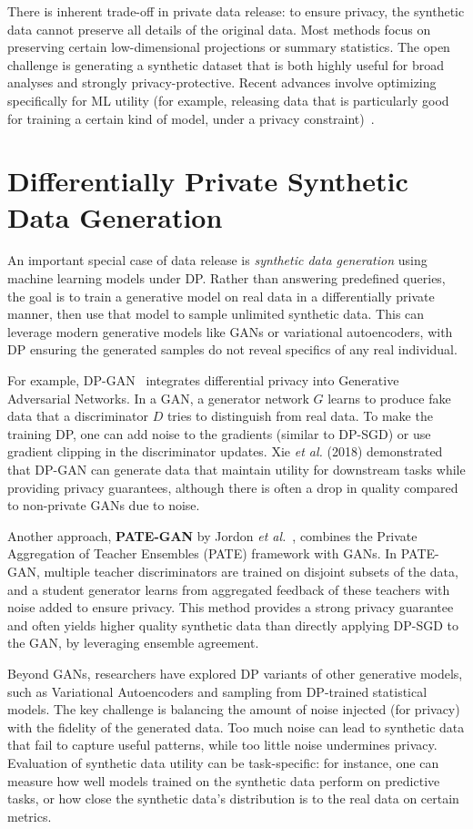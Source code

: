 \documentclass[11pt]{article}
\theoremstyle{remark}
\theoremstyle{definition}
\theoremstyle{plain}
\begin{document}
There is inherent trade-off in private data release: to ensure privacy, the synthetic data cannot preserve all details of the original data. Most methods focus on preserving certain low-dimensional projections or summary statistics. The open challenge is generating a synthetic dataset that is both highly useful for broad analyses and strongly privacy-protective. Recent advances involve optimizing specifically for ML utility (for example, releasing data that is particularly good for training a certain kind of model, under a privacy constraint)~\cite{Chen2020}.

\section{Differentially Private Synthetic Data Generation}

An important special case of data release is \emph{synthetic data generation} using machine learning models under DP. Rather than answering predefined queries, the goal is to train a generative model on real data in a differentially private manner, then use that model to sample unlimited synthetic data. This can leverage modern generative models like GANs or variational autoencoders, with DP ensuring the generated samples do not reveal specifics of any real individual.

For example, DP-GAN~\cite{Xie2018} integrates differential privacy into Generative Adversarial Networks. In a GAN, a generator network $G$ learns to produce fake data that a discriminator $D$ tries to distinguish from real data. To make the training DP, one can add noise to the gradients (similar to DP-SGD) or use gradient clipping in the discriminator updates. Xie \textit{et al.} (2018) demonstrated that DP-GAN can generate data that maintain utility for downstream tasks while providing privacy guarantees, although there is often a drop in quality compared to non-private GANs due to noise.

Another approach, \textbf{PATE-GAN} by Jordon \textit{et al.}~\cite{Jordon2018}, combines the Private Aggregation of Teacher Ensembles (PATE) framework with GANs. In PATE-GAN, multiple teacher discriminators are trained on disjoint subsets of the data, and a student generator learns from aggregated feedback of these teachers with noise added to ensure privacy. This method provides a strong privacy guarantee and often yields higher quality synthetic data than directly applying DP-SGD to the GAN, by leveraging ensemble agreement.

Beyond GANs, researchers have explored DP variants of other generative models, such as Variational Autoencoders and sampling from DP-trained statistical models. The key challenge is balancing the amount of noise injected (for privacy) with the fidelity of the generated data. Too much noise can lead to synthetic data that fail to capture useful patterns, while too little noise undermines privacy. Evaluation of synthetic data utility can be task-specific: for instance, one can measure how well models trained on the synthetic data perform on predictive tasks, or how close the synthetic data's distribution is to the real data on certain metrics.
\end{document}
